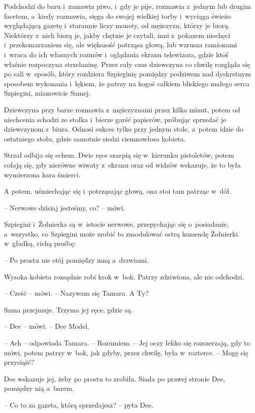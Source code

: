 \documentclass[oneside,polish,11pt,sfheadings]{mwbk}
\begin{document}
Podchodzi do baru i~zamawia piwo, i~gdy je pije, rozmawia z~jednym lub
drugim facetem, a~kiedy rozmawia, sięga do swojej wielkiej torby i~wyciąga świeżo wyglądającą gazetę i~starannie liczy monety, od mężczyzn,
którzy je biorą. Niektórzy z~nich biorą je, jakby chętnie je czytali,
inni z~pokazem niechęci i~przekomarzaniem się, ale większość potrząsa
głową, lub wzrusza ramionami i~wraca do ich własnych rozmów i~oglądania
ekranu telewizora, gdzie ktoś właśnie rozpoczyna strzelaninę. Przez cały
czas dziewczyna co chwilę rozgląda się po sali w~sposób, który rozdziera
Szpieginię pomiędzy podziwem nad dyskretnym sposobem wykonania i~lękiem,
że patrzy na kogoś całkiem bliskiego małego serca Szpiegini, mianowicie
Samej.

Dziewczyna przy barze rozmawia z~mężczyznami przez kilka minut, potem od
niechcenia schodzi ze stołka i~bierze garść papierów, próbując sprzedać
je dziewczynom z~biura. Odnosi sukces tylko przy jednym stole, a~potem
idzie do ostatniego stołu, gdzie samotnie siedzi ciemnowłosa kobieta.

Strzał odbija się echem. Dwie ręce szarpią się w~kierunku pistoletów,
potem cofają się, gdy nierówne wiwaty z~ekranu oraz od widzów wskazuje,
że to była wymierzona kara śmierci.

A potem, uśmiechając się i~potrząsając głową, ona stoi tam patrząc w~dół. 

-- Nerwowe dzisiaj jesteśmy, co? -- mówi.

Szpiegini i~Żołnierka są w~istocie nerwowe, przepychając się o~posiadanie, a~wszystko, co Szpiegini może zrobić to zmodulować ostrą
komendę Żołnierki w~gładką, cichą prośbę: 

-- Po prostu nie stój pomiędzy
mną a~drzwiami.

Wysoka kobieta rozsądnie robi krok w~bok. Patrzy zdziwiona, ale nie
odchodzi.

-- Cześć -- mówi. -- Nazywam się Tamara. A Ty?

Sama przejmuje. Trzyma jej ręce, gdzie są.

-- Dee -- mówi. -- Dee Model.

-- Ach -- odpowiada Tamara. -- Rozumiem. -- Jej oczy lekko się rozszerzają,
gdy to mówi, potem patrzy w~bok, jak gdyby, przez chwilę, była w~rozterce. -- Mogę się przysiąść?

Dee wskazuje jej, żeby po prostu to zrobiła. Siada po prawej stronie
Dee, pomiędzy nią a~barem.

-- Co to za gazeta, którą sprzedajesz? -- pyta Dee.
\end{document}
